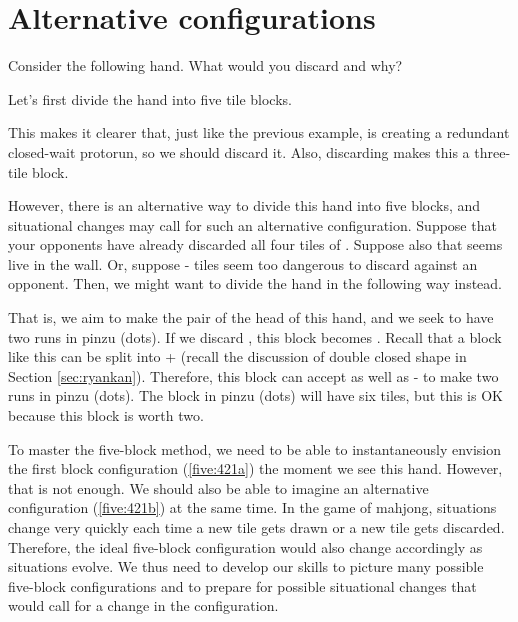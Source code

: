 \section{Alternative configurations}
Consider the following hand. What would you discard and why?

\bp
{}\zhong\zhong\zhong
\ep

Let's first divide the hand into five tile blocks. 

\emj

This makes it clearer that, just like the previous example, {\LARGE{}} is creating a redundant closed-wait protorun, so we should discard it. Also, discarding {\LARGE{}} makes this a three-tile block. 

\bigskip
However, there is an alternative way to divide this hand into five blocks, and situational changes may call for such an alternative configuration. 
Suppose that your opponents have already discarded all four tiles of {\LARGE{}}. Suppose also that {\LARGE{}} seems live in the wall. Or, suppose {\LARGE{}-} tiles seem too dangerous to discard against an opponent. Then, we might want to divide the hand in the following way instead. 

\emj

That is, we aim to make the pair of {\LARGE{}} the head of this hand, and we seek to have two runs in {\jap pinzu} (dots). If we discard {\LARGE{}}, this block becomes {\LARGE{}}. 
Recall that a block like this can be split into {\LARGE{} + } (recall the discussion of double closed shape in Section \ref{sec:ryankan}). Therefore, this block can accept {\LARGE{}} as well as {\LARGE{}-} to make two runs in {\jap pinzu} (dots). The block in {\jap pinzu} (dots) will have six tiles, but this is OK because this block is worth two. 

\bigskip
To master the five-block method, we need to be able to instantaneously envision the first block configuration (\ref{five:421a}) the moment we see this hand. However, that is not enough. We should also be able to imagine an alternative configuration (\ref{five:421b}) at the same time. 
In the game of mahjong, situations change very quickly each time a new tile gets drawn or a new tile gets discarded. Therefore, the ideal five-block configuration would also change accordingly as situations evolve. We thus need to develop our skills to picture many possible five-block configurations and to prepare for possible situational changes that would call for a change in the configuration.

